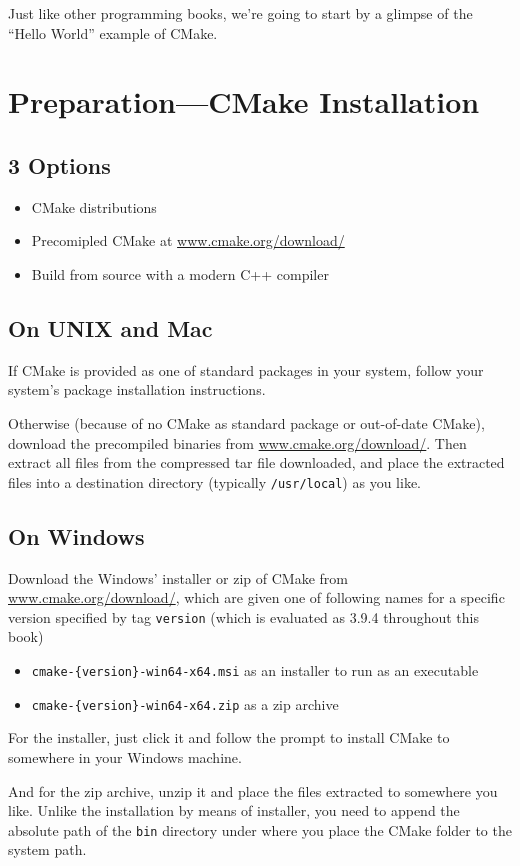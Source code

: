 Just like other programming books, we're going to start by a glimpse of the ``Hello World'' example of CMake.
\section{Preparation---CMake Installation}
\subsection{3 Options}
  \begin{itemize}  
    \item CMake distributions
    \item Precomipled CMake at \url{www.cmake.org/download/}
    \item Build from source with a modern C++ compiler
  \end{itemize}  
\subsection{On UNIX and Mac}
  If CMake is provided as one of standard packages in your system, follow your system's package installation instructions.\par
  Otherwise (because of no CMake as standard package or out-of-date CMake), download the precompiled binaries from \url{www.cmake.org/download/}. Then extract all files from the compressed tar file downloaded, and place the extracted files into a destination directory (typically \texttt{/usr/local}) as you like.
\subsection{On Windows}
  Download the Windows' installer or zip of CMake from \url{www.cmake.org/download/}, which are given one of following names for a specific version specified by tag \texttt{version} (which is evaluated as 3.9.4 throughout this book)
  \begin{itemize}  
    \item \texttt{cmake-\{version\}-win64-x64.msi} as an installer to run as an executable
    \item \texttt{cmake-\{version\}-win64-x64.zip} as a zip archive
  \end{itemize}  
  For the installer, just click it and follow the prompt to install CMake to somewhere in your Windows machine.\par
  And for the zip archive, unzip it and place the files extracted to somewhere you like. Unlike the installation by means of installer, you need to append the absolute path of the \texttt{bin} directory under where you place the CMake folder to the system path.
